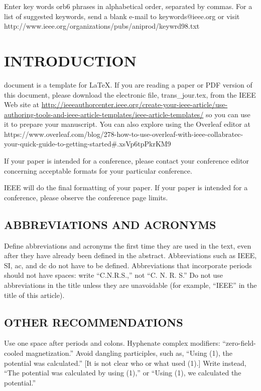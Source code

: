 \documentclass{IEEEoj}
\begin{document}
\begin{IEEEkeywords}
Enter key words orb6 phrases in alphabetical order, separated by commas. For a list of suggested keywords, send a blank e-mail to keywords@ieee.org or visit 
http://www.ieee.org/\discretionary{}{}{}organizations/pubs/ani\textunderscore prod/keywrd98.txt
\end{IEEEkeywords}


\maketitle

\section{INTRODUCTION}
 document is a template for \LaTeX. If you are 
reading a paper or PDF version of this document, please download the 
electronic file, trans\_jour.tex, from the IEEE Web site at \underline
{http://ieeeauthorcenter.ieee.org/create-your-ieee-article/}\break\underline{use-authoring-tools-and-ieee-article-templates/ieee-article-}\break\underline{templates/} so you can use it to prepare your manuscript.
You can also explore using the Overleaf editor at 
{https://www.overleaf.com/blog/278-how-to-use-overleaf-with-ieee-collabratec-your-quick-guide-to-getting-started\break\#.xsVp6tpPkrKM9}

If your paper is intended for a conference, please contact your conference 
editor concerning acceptable formats for your particular 
conference.

IEEE will do the final formatting of your paper. If your paper is intended 
for a conference, please observe the conference page limits.

\subsection{ABBREVIATIONS AND ACRONYMS}
Define abbreviations and acronyms the first time they are used in the text, 
even after they have already been defined in the abstract. Abbreviations 
such as IEEE, SI, ac, and dc do not have to be defined. Abbreviations that 
incorporate periods should not have spaces: write ``C.N.R.S.,'' not ``C. N. 
R. S.'' Do not use abbreviations in the title unless they are unavoidable 
(for example, ``IEEE'' in the title of this article).

\subsection{OTHER RECOMMENDATIONS}
Use one space after periods and colons. Hyphenate complex modifiers: 
``zero-field-cooled magnetization.'' Avoid dangling participles, such as, 
``Using (1), the potential was calculated.'' [It is not clear who or what 
used (1).] Write instead, ``The potential was calculated by using (1),'' or 
``Using (1), we calculated the potential.''
\end{document}
